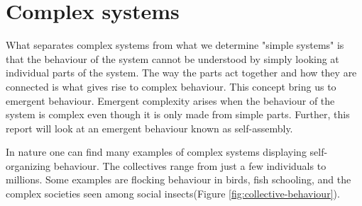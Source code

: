 \section{Complex systems}
\label{sec:complex_systems}
What separates complex systems from what we determine "simple systems" is that the behaviour of the system cannot be understood by simply looking at individual parts of the system.
The way the parts act together and how they are connected is what gives rise to complex behaviour.
This concept bring us to emergent behaviour.
Emergent complexity arises when the behaviour of the system is complex even though it is only made from simple parts.
Further, this report will look at an emergent behaviour known as self-assembly.  

In nature one can find many examples of complex systems displaying self-organizing behaviour.
The collectives range from just a few individuals to millions.
Some examples are flocking behaviour in birds, fish schooling, and the complex societies seen among social insects(Figure \ref{fig:collective-behaviour}). 

